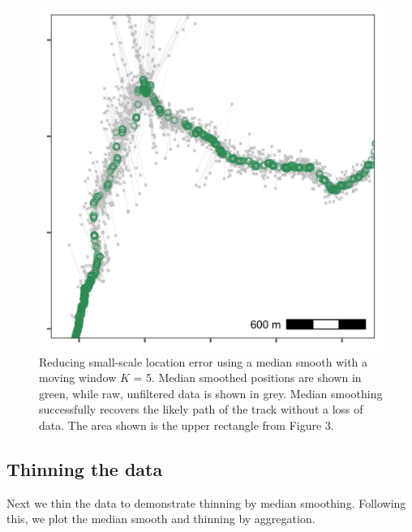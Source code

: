 \documentclass[
]{scrartcl}
\begin{document}
\begin{figure}
\centering
\includegraphics{figures/fig_calib_median_smooth.png}
\caption{Reducing small-scale location error using a median smooth with a moving window \(K\) = 5. Median smoothed positions are shown in green, while raw, unfiltered data is shown in grey. Median smoothing successfully recovers the likely path of the track without a loss of data. The area shown is the upper rectangle from Figure 3.}
\end{figure}

\hypertarget{thinning-the-data}{%
\subsection{Thinning the data}\label{thinning-the-data}}

Next we thin the data to demonstrate thinning by median smoothing.
Following this, we plot the median smooth and thinning by aggregation.
\end{document}
